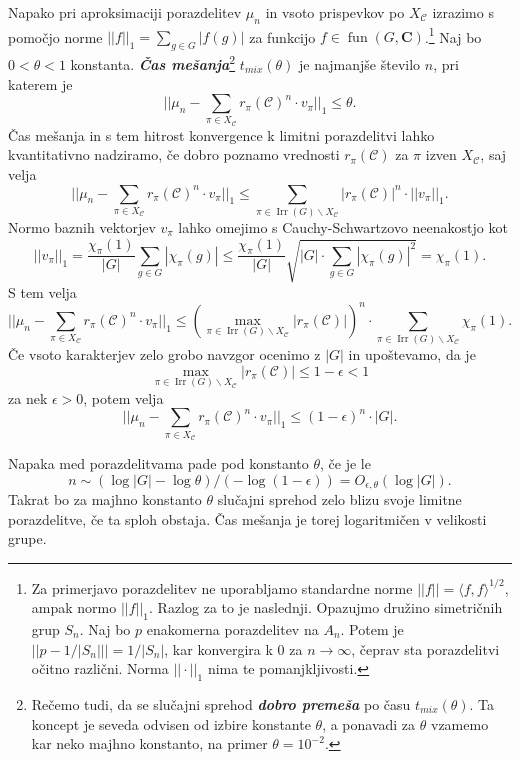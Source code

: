 \documentclass[11pt]{book}
\def\CC{\mathbf{C}}
\def\conclass{\mathcal{C}}
\DeclareMathOperator\Irr{Irr}
\DeclareMathOperator\fun{fun}
\def\definicija{\color{rdeca}\bf\em}
\theoremstyle{definition}
\theoremstyle{zgled}
\theoremstyle{odprtproblem}
\theoremstyle{domacanaloga}
\theoremstyle{izrek}
\begin{document}
Napako pri aproksimaciji porazdelitev $\mu_n$ in vsoto prispevkov po $X_{\conclass}$ izrazimo s pomočjo norme $||f||_1 = \sum_{g \in G} |f(g)|$ za funkcijo $f \in \fun(G,\CC)$.\footnote{Za primerjavo porazdelitev ne uporabljamo standardne norme $||f|| = \langle f, f \rangle^{1/2}$, ampak normo $||f||_1$. Razlog za to je naslednji. Opazujmo družino simetričnih grup $S_n$. Naj bo $p$ enakomerna porazdelitev na $A_n$. Potem je $||p - 1/|S_n||| = 1/|S_n|$, kar konvergira k $0$ za $n \to \infty$, čeprav sta porazdelitvi očitno različni. Norma $||\cdot||_1$ nima te pomanjkljivosti.} Naj bo $0 < \theta < 1$ konstanta. {\definicija Čas mešanja}\footnote{Rečemo tudi, da se slučajni sprehod {\definicija dobro premeša} po času $t_{mix}(\theta)$. Ta koncept je seveda odvisen od izbire konstante $\theta$, a ponavadi za $\theta$ vzamemo kar neko majhno konstanto, na primer $\theta = 10^{-2}$.} $t_{mix}(\theta)$ je  najmanjše število $n$, pri katerem je 
\[
    || \mu_n -  \sum_{\pi \in X_{\conclass}} r_{\pi}(\conclass)^n \cdot v_{\pi} ||_1  \leq \theta.
\]
Čas mešanja in s tem hitrost konvergence k limitni porazdelitvi lahko kvantitativno nadziramo, če dobro poznamo vrednosti $r_{\pi}(\conclass)$ za $\pi$ izven $X_{\conclass}$, saj velja
\[
    || \mu_n -  \sum_{\pi \in X_{\conclass}} r_{\pi}(\conclass)^n \cdot v_{\pi} ||_1
    \leq
    \sum_{\pi \in \Irr(G) \backslash X_{\conclass}} |r_{\pi}(\conclass)|^n \cdot ||v_{\pi}||_1.
\]
Normo baznih vektorjev $v_{\pi}$ lahko omejimo s Cauchy-Schwartzovo neenakostjo kot
\[
    ||v_{\pi}||_1 = \frac{\chi_{\pi}(1)}{|G|} \sum_{g \in G} |\chi_{\pi}(g)|
    \leq \frac{\chi_{\pi}(1)}{|G|} \sqrt{|G| \cdot \sum_{g \in G} |\chi_{\pi}(g)|^2}
    = \chi_{\pi}(1).
\]
S tem velja
\[
    || \mu_n -  \sum_{\pi \in X_{\conclass}} r_{\pi}(\conclass)^n \cdot v_{\pi} ||_1
    \leq \left( \max_{\pi \in \Irr(G) \backslash X_{\conclass}} |r_{\pi}(\conclass)| \right)^n  \cdot \sum_{\pi \in \Irr(G) \backslash X_{\conclass}} \chi_{\pi}(1).
\]
Če vsoto karakterjev zelo grobo navzgor ocenimo z $|G|$ in upoštevamo, da je 
\[
    \max_{\pi \in \Irr(G) \backslash X_{\conclass}} |r_{\pi}(\conclass)|  \leq 1 - \epsilon < 1
\]
za nek $\epsilon > 0$, potem velja
\[
    || \mu_n -  \sum_{\pi \in X_{\conclass}} r_{\pi}(\conclass)^n \cdot v_{\pi} ||_1
    \leq (1 - \epsilon)^n \cdot |G|.
\]


Napaka med porazdelitvama pade pod konstanto $\theta$, če je le
\[
n \sim (\log |G| - \log \theta)/(- \log (1 - \epsilon)) = O_{\epsilon, \theta}(\log |G|).
\]
Takrat bo za majhno konstanto $\theta$ slučajni sprehod zelo blizu svoje limitne porazdelitve, če ta sploh obstaja. Čas mešanja je torej logaritmičen v velikosti grupe.
\end{document}
